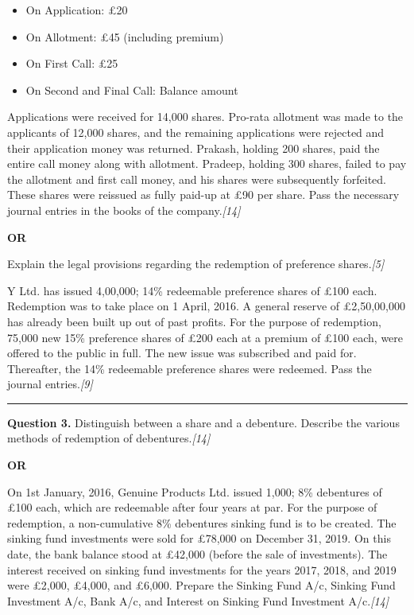 \documentclass[11pt,a4paper]{article}
\newcommand{\pts}[1]{\hfill   \textit{[#1]}}
\begin{document}
\begin{itemize}[itemsep=2pt,topsep=2pt]
  \item On Application: \pounds 20
  \item On Allotment: \pounds 45 (including premium)
  \item On First Call: \pounds 25
  \item On Second and Final Call: Balance amount
\end{itemize}
Applications were received for 14,000 shares. Pro-rata allotment was made to the applicants of 12,000 shares, and the remaining applications were rejected and their application money was returned. Prakash, holding 200 shares, paid the entire call money along with allotment. Pradeep, holding 300 shares, failed to pay the allotment and first call money, and his shares were subsequently forfeited. These shares were reissued as fully paid-up at \pounds 90 per share. Pass the necessary journal entries in the books of the company.\pts{14}

\centerline{   \textbf{OR}}


\begin{parts}
  \item Explain the legal provisions regarding the redemption of preference shares.\pts{5}
  \item Y Ltd. has issued 4,00,000; 14\% redeemable preference shares of \pounds 100 each. Redemption was to take place on 1 April, 2016. A general reserve of \pounds 2,50,00,000 has already been built up out of past profits. For the purpose of redemption, 75,000 new 15\% preference shares of \pounds 200 each at a premium of \pounds 100 each, were offered to the public in full. The new issue was subscribed and paid for. Thereafter, the 14\% redeemable preference shares were redeemed. Pass the journal entries.\pts{9}
\end{parts}

\medskip\rule{\linewidth}{0.2pt}




\noindent   \textbf{Question 3.}
Distinguish between a share and a debenture. Describe the various methods of redemption of debentures.\pts{14}

\centerline{   \textbf{OR}}

On 1st January, 2016, Genuine Products Ltd. issued 1,000; 8\% debentures of \pounds 100 each, which are redeemable after four years at par. For the purpose of redemption, a non-cumulative 8\% debentures sinking fund is to be created. The sinking fund investments were sold for \pounds 78,000 on December 31, 2019. On this date, the bank balance stood at \pounds 42,000 (before the sale of investments). The interest received on sinking fund investments for the years 2017, 2018, and 2019 were \pounds 2,000, \pounds 4,000, and \pounds 6,000. Prepare the Sinking Fund A/c, Sinking Fund Investment A/c, Bank A/c, and Interest on Sinking Fund Investment A/c.\pts{14}
\end{document}
